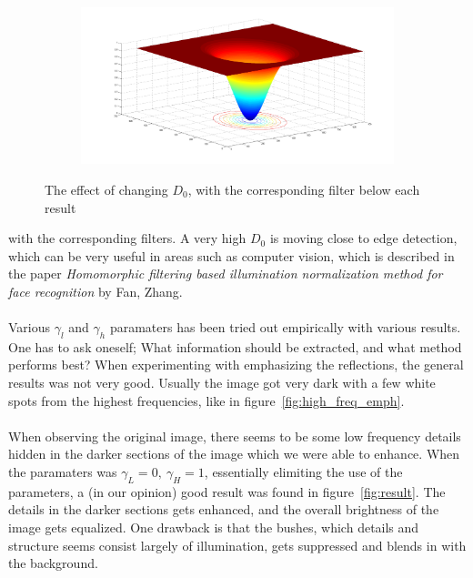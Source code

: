 \begin{figure}[h!]
\begin{subfigure}[b]{0.6\textwidth}
				\caption{}
				\label{fig:low_sigma_filter}
			\end{subfigure}%
			\begin{subfigure}[b]{0.6\textwidth}
				\includegraphics[width=\textwidth]{pics/high_sigma_filter.png}
				\caption{}
				\label{fig:high_sigma_filter}
			\end{subfigure}
			\label{fig:sigma}
		\caption{The effect of changing $D_0$, with the corresponding filter below each result}				
		\end{figure}
		with the corresponding filters. A very high $D_0$ is moving close to edge detection,
		which can be very useful in areas such as computer vision, which is described in 
		the paper \emph{Homomorphic filtering based illumination normalization 
		method for face recognition} by Fan, Zhang.\\
		\\
		Various $\gamma_l$ and $\gamma_h$ paramaters has been tried out empirically with 
		various results. One has to ask oneself; What information should be extracted, and what 
		method performs best? When experimenting with emphasizing the reflections, the 
		general results was not very good. Usually the image got very dark with a few white
		spots from the highest frequencies, like in figure~\ref{fig:high_freq_emph}.\\
		\\
		When observing the original image, there seems to be some 
		low frequency details hidden in the darker sections of the image which we were able
		to enhance. When the paramaters was $\gamma_L = 0,~\gamma_H = 1$,
		essentially elimiting the use of the parameters, a (in our opinion) good result was 
		found in figure~\ref{fig:result}. The details in the darker sections gets enhanced, 
		and the overall brightness
		of the image gets equalized. One drawback is that the bushes, which details 
		and structure seems consist
		largely of illumination, gets suppressed and blends in with the background.\\

